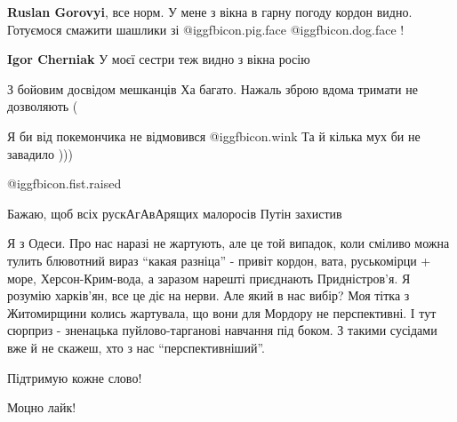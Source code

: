\begin{itemize}
\textbf{Ruslan Gorovyi}, все норм. У мене з вікна в гарну погоду кордон видно. Готуємося смажити шашлики зі  @igg{fbicon.pig.face}  @igg{fbicon.dog.face} !

\textbf{Igor Cherniak} У моєї сестри теж видно з вікна росію

З бойовим досвідом мешканців Ха багато. Нажаль зброю вдома тримати не дозволяють (

Я би від покемончика не відмовився  @igg{fbicon.wink}  Та й кілька мух би не завадило )))

 @igg{fbicon.fist.raised} 

Бажаю, щоб всіх рускАгАвАрящих малоросів Путін захистив


Я з Одеси. Про нас наразі не жартують, але це той випадок, коли сміливо можна
тулить блювотний вираз \enquote{какая разніца} - привіт кордон, вата, руськомірци +
море, Херсон-Крим-вода, а заразом нарешті приєднають Придністров'я. Я розумію
харків'ян, все це діє на нерви. Але який в нас вибір? Моя тітка з Житомирщини
колись жартувала, що вони для Мордору не перспективні. І тут сюрприз -
зненацька пуйлово-тарганові навчання під боком. З такими сусідами вже й не
скажеш, хто з нас \enquote{перспективніший}.


Підтримую кожне слово!

Моцно лайк!

\end{itemize} %
